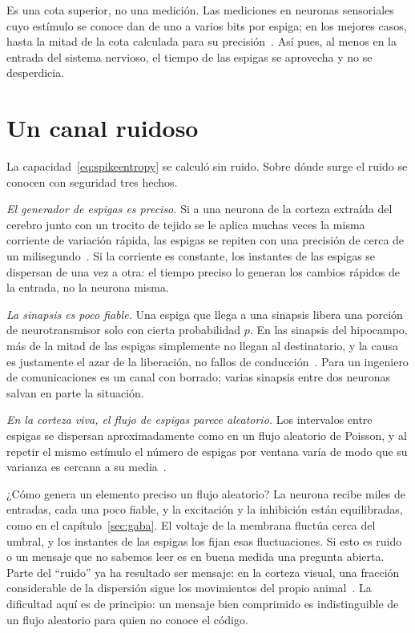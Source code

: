 Es una cota superior, no una medición. Las mediciones en neuronas sensoriales cuyo estímulo se conoce dan de uno a varios bits por espiga; en los mejores casos, hasta la mitad de la cota calculada para su precisión~\cite{Rieke1997}. Así pues, al menos en la entrada del sistema nervioso, el tiempo de las espigas se aprovecha y no se desperdicia.

\section{Un canal ruidoso}

La capacidad~\eqref{eq:spikeentropy} se calculó sin ruido. Sobre dónde surge el ruido se conocen con seguridad tres hechos.

\emph{El generador de espigas es preciso.} Si a una neurona de la corteza extraída del cerebro junto con un trocito de tejido se le aplica muchas veces la misma corriente de variación rápida, las espigas se repiten con una precisión de cerca de un milisegundo~\cite{Mainen1995}. Si la corriente es constante, los instantes de las espigas se dispersan de una vez a otra: el tiempo preciso lo generan los cambios rápidos de la entrada, no la neurona misma.

\emph{La sinapsis es poco fiable.} Una espiga que llega a una sinapsis  libera una porción de neurotransmisor solo con cierta probabilidad $p$. En las sinapsis del hipocampo, más de la mitad de las espigas simplemente no llegan al destinatario, y la causa es justamente el azar de la liberación, no fallos de conducción~\cite{AllenStevens1994}. Para un ingeniero de comunicaciones es un canal con borrado; varias sinapsis entre dos neuronas salvan en parte la situación.

\emph{En la corteza viva, el flujo de espigas parece aleatorio.} Los intervalos entre espigas se dispersan aproximadamente como en un flujo aleatorio de Poisson, y al repetir el mismo estímulo el número de espigas por ventana varía de modo que su varianza es cercana a su media~\cite{Softky1993}.

¿Cómo genera un elemento preciso un flujo aleatorio? La neurona recibe miles de entradas, cada una poco fiable, y la excitación y la inhibición están equilibradas, como en el capítulo~\ref{sec:gaba}. El voltaje de la membrana fluctúa cerca del umbral, y los instantes de las espigas los fijan esas fluctuaciones. Si esto es ruido o un mensaje que no sabemos leer es en buena medida una pregunta abierta. Parte del “ruido” ya ha resultado ser mensaje: en la corteza visual, una fracción considerable de la dispersión sigue los movimientos del propio animal~\cite{Stringer2019}. La dificultad aquí es de principio: un mensaje bien comprimido es indistinguible de un flujo aleatorio para quien no conoce el código.

